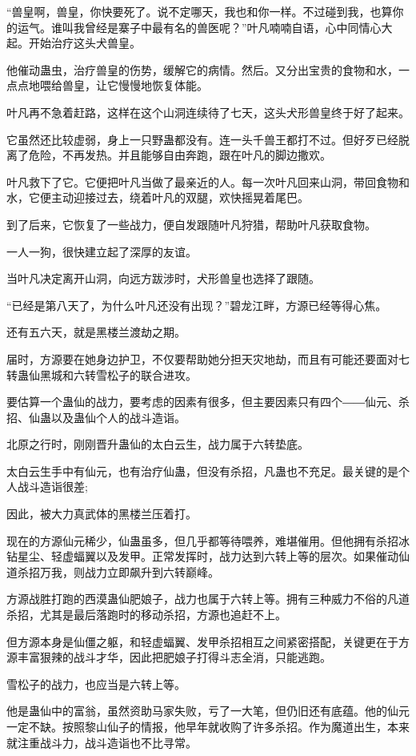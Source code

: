 \begin{this_body}
“兽皇啊，兽皇，你快要死了。说不定哪天，我也和你一样。不过碰到我，也算你的运气。谁叫我曾经是寨子中最有名的兽医呢？”叶凡喃喃自语，心中同情心大起。开始治疗这头犬兽皇。

他催动蛊虫，治疗兽皇的伤势，缓解它的病情。然后。又分出宝贵的食物和水，一点点地喂给兽皇，让它慢慢地恢复体能。

叶凡再不急着赶路，这样在这个山洞连续待了七天，这头犬形兽皇终于好了起来。

它虽然还比较虚弱，身上一只野蛊都没有。连一头千兽王都打不过。但好歹已经脱离了危险，不再发热。并且能够自由奔跑，跟在叶凡的脚边撒欢。

叶凡救下了它。它便把叶凡当做了最亲近的人。每一次叶凡回来山洞，带回食物和水，它便主动迎接过去，绕着叶凡的双腿，欢快摇晃着尾巴。

到了后来，它恢复了一些战力，便自发跟随叶凡狩猎，帮助叶凡获取食物。

一人一狗，很快建立起了深厚的友谊。

当叶凡决定离开山洞，向远方跋涉时，犬形兽皇也选择了跟随。

“已经是第八天了，为什么叶凡还没有出现？”碧龙江畔，方源已经等得心焦。

还有五六天，就是黑楼兰渡劫之期。

届时，方源要在她身边护卫，不仅要帮助她分担天灾地劫，而且有可能还要面对七转蛊仙黑城和六转雪松子的联合进攻。

要估算一个蛊仙的战力，要考虑的因素有很多，但主要因素只有四个――仙元、杀招、仙蛊以及蛊仙个人的战斗造诣。

北原之行时，刚刚晋升蛊仙的太白云生，战力属于六转垫底。

太白云生手中有仙元，也有治疗仙蛊，但没有杀招，凡蛊也不充足。最关键的是个人战斗造诣很差;

因此，被大力真武体的黑楼兰压着打。

现在的方源仙元稀少，仙蛊虽多，但几乎都等待喂养，难堪催用。但他拥有杀招冰钻星尘、轻虚蝠翼以及发甲。正常发挥时，战力达到六转上等的层次。如果催动仙道杀招万我，则战力立即飙升到六转巅峰。

方源战胜打跑的西漠蛊仙肥娘子，战力也属于六转上等。拥有三种威力不俗的凡道杀招，尤其是最后落跑时的移动杀招，方源也追赶不上。

但方源本身是仙僵之躯，和轻虚蝠翼、发甲杀招相互之间紧密搭配，关键更在于方源丰富狠辣的战斗才华，因此把肥娘子打得斗志全消，只能逃跑。

雪松子的战力，也应当是六转上等。

他是蛊仙中的富翁，虽然资助马家失败，亏了一大笔，但仍旧还有底蕴。他的仙元一定不缺。按照黎山仙子的情报，他早年就收购了许多杀招。作为魔道出生，本来就注重战斗力，战斗造诣也不比寻常。


\end{this_body}
